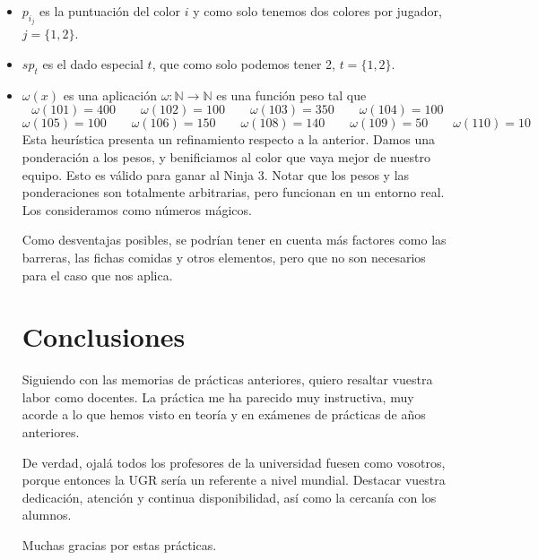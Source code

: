 \documentclass[10pt,a4paper]{article}
\begin{document}
\begin{itemize}
	\item \(p_{i_j}\) es la puntuación del color \(i\) y como solo tenemos dos colores por jugador, \(j = \{1,2\}\).
	\item \(sp_t\) es el dado especial \(t\), que como solo podemos tener 2, \(t = \{1,2\}\).
	\item \(\omega (x)\) es una aplicación \(\omega : \mathbb{N} \to \mathbb{N}\) es una función peso tal que
	\[
		\omega (101) = 400 \qquad \omega (102) = 100 \qquad \omega (103) = 350 \qquad \omega (104) = 100
	\]
	\[
		\omega (105) = 100 \qquad \omega (106) = 150 \qquad \omega (108) = 140 \qquad \omega (109) = 50 \qquad \omega (110) = 10
	\]
Esta heurística presenta un refinamiento respecto a la anterior. Damos una ponderación a los pesos, y benificiamos al color que vaya mejor de nuestro equipo. Esto es válido para ganar al Ninja 3. Notar que los pesos y las ponderaciones son totalmente arbitrarias, pero funcionan en un entorno real. Los consideramos como números mágicos.

Como desventajas posibles, se podrían tener en cuenta más factores como las barreras, las fichas comidas y otros elementos, pero que no son necesarios para el caso que nos aplica.

\section{Conclusiones}
Siguiendo con las memorias de prácticas anteriores, quiero resaltar vuestra labor como docentes. La práctica me ha parecido muy instructiva, muy acorde a lo que hemos visto en teoría y en exámenes de prácticas de años anteriores. 

De verdad, ojalá todos los profesores de la universidad fuesen como vosotros, porque entonces la UGR sería un referente a nivel mundial. Destacar vuestra dedicación, atención y continua disponibilidad, así como la cercanía con los alumnos.

Muchas gracias por estas prácticas.
\end{itemize}
\end{document}
